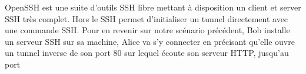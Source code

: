 OpenSSH est une suite d'outils SSH libre mettant à disposition un client et server SSH très complet. Hors le SSH permet d'initialiser un tunnel directement avec une commande SSH. Pour en revenir sur notre scénario précédent, Bob installe un serveur SSH sur sa machine, Alice va s'y connecter en précisant qu'elle ouvre un tunnel inverse de son port 80 sur lequel écoute son serveur HTTP, jusqu'au port 



